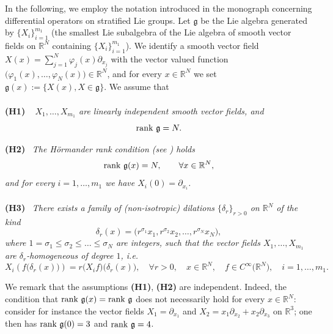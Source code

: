 \documentclass[11pt,a4paper]{article}
\numberwithin{equation}{section}
\newcommand{\R}{\mathbb{R}}
\def \rn {{\mathbb {R}}^{N}}
\def \p {\partial}
\def \rank {{\text{\rm rank }}}
\def \d {{\delta}}
\def \phi {{\varphi}}
\begin{document}
In the following, we employ the notation introduced in the monograph \cite{biagi2019introduction} concerning differential operators on stratified Lie groups. Let $\mathfrak{g}$ be the Lie algebra generated by $\!\{X_i\}^{m_1}_{i=1}$ (the smallest Lie subalgebra of the Lie algebra
of smooth vector fields on $\rn\!$ containing $\!\{X_i\}^{m_1}_{i=1}$). We identify a smooth vector field $X(x)\!=\!\sum_{j=1}^N \phi_j(x)\p_{x_j}$  with the vector valued function $\big(\phi_1(x),\ldots,\phi_N(x)\big)\in \rn$, and for every $x\in\R^N$ we set $\mathfrak{g} (x):=\big\{X(x), X\in  \mathfrak{g} \big\}$. We assume that
\\\\\medskip
\noindent
{{\bf(H1)}}  \ {
\it $X_1,\ldots,X_{m_1}$ are linearly independent smooth vector fields, and 
	\vspace{-0.3cm}
\begin{equation}
	\rank \mathfrak{g}=N.
		\end{equation}}{{{\bf(H2)}} \ {\it The  Hörmander rank condition (see \cite{hormander1967hypoelliptic}) holds
\begin{equation}
	\rank \mathfrak{g}(x)=N,\qquad \forall x \in \rn,
\end{equation}
and for every $i=1,\ldots ,m_1$ we have $X_i(0)=\p_{x_i}$.}
\\\\{{\bf(H3)}}\ {
\it There exists a family of (non-isotropic) dilations $\{\d_r\}_{r>0}$ on $\rn$ of the kind
\begin{equation}\label{eq:dilH3}
	\d_r(x)=\Big(r^{\sigma_1}x_1, r^{\sigma_2}x_2,\ldots,r^{\sigma_N} x_N\Big),
\end{equation}
where $1 = \sigma_1 \leq \sigma_2 \leq \ldots \leq \sigma_N$ are integers, such that the vector fields $X_1,\ldots,X_{m_1}$ are $\d_r$-homogeneous of degree $1$, i.e.
\begin{equation*}
	X_i \left( f \big(\delta_r(x)\big) \right)=r\big(X_i f \big)  \big(\delta_r(x)\big), \quad \forall r>0,\quad x \in\rn, \quad f \in C^\infty\big(\R^N\big),\quad i=1, \ldots,m_1.
\end{equation*}}

\smallskip 

We remark that the assumptions \textbf{(H1)}, \textbf{(H2)} are independent. Indeed, the condition that $\rank \mathfrak{g}(x) = \rank \mathfrak{g}$ does not necessarily hold for every $x \in \rn$: consider for instance the vector fields $X_1=\p_{x_1}$ and $X_2=x_1\p_{x_2}+x_2\p_{x_3}$ on $\R^3$; one then has $\rank \mathfrak{g}(0)=3$ and $\rank \mathfrak{g}=4$. 

}
\end{document}
